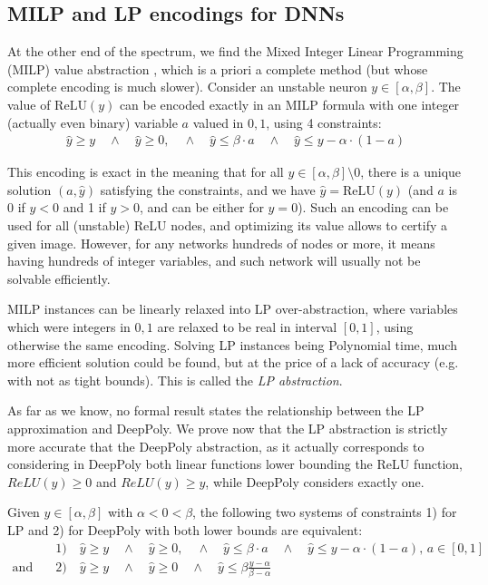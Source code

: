 \documentclass{llncs}
\newcommand{\ReLU}{\mathrm{ReLU}}
\begin{document}
\subsection{MILP and LP encodings for DNNs}

At the other end of the spectrum, we find the Mixed Integer Linear Programming (MILP) value abstraction \cite{MILP}, which is a priori a complete method (but whose complete encoding is much slower). 
Consider an unstable neuron $y \in[\alpha,\beta]$. The value of $\ReLU(y)$ can be encoded exactly in an MILP formula with one integer (actually even binary) variable $a$ valued in ${0,1}$, using 4 constraints:
\vspace{-0.1cm}
\begin{align*}
	\hat{y} \geq y \quad \wedge \quad \hat{y} \geq 0, \quad \wedge \quad \hat{y} \leq \beta \cdot a \quad \wedge \quad \hat{y} \leq y-\alpha \cdot (1-a)
\end{align*}

This encoding is exact in the meaning that \cite{MILP} for all $y \in [\alpha,\beta] \setminus 0$, there is a unique solution $(a,\hat{y})$ satisfying the constraints, and we have $\hat{y}=\ReLU(y)$ (and $a$ is 0 if $y < 0$ and 1 if $y>0$, and can be either for $y=0$). Such an encoding can be used for all (unstable) ReLU nodes, and optimizing its value allows to certify a given image. However, for any networks hundreds of nodes or more, it means having hundreds of integer variables, and such network will usually not be solvable efficiently.

MILP instances can be linearly relaxed into LP over-abstraction, where variables which were integers in 
${0,1}$ are relaxed to be real in interval $[0,1]$, using otherwise the same encoding. 
Solving LP instances being Polynomial time, much more efficient solution could be found, but at the price of a lack of accuracy (e.g. with not as tight bounds). This is called the {\em LP abstraction}.

As far as we know, no formal result states the relationship between the LP approximation and DeepPoly.
We prove now that the LP abstraction is strictly more accurate that the DeepPoly abstraction, as it actually corresponds to considering in DeepPoly both linear functions lower bounding the ReLU function, $ReLU(y) \geq 0$ and $ReLU(y) \geq y$, while DeepPoly considers exactly one.

\begin{proposition}
	\label{LP}
 Given $y \in [\alpha,\beta]$ with $\alpha < 0 < \beta$, the following two systems of constraints 
 1) for LP and 2) for DeepPoly with both lower bounds are equivalent:
 \vspace{-0.3cm}
 \begin{align*}
	 & 1) \quad \hat{y} \geq y \quad \wedge \quad \hat{y} \geq 0, \quad \wedge \quad \hat{y} \leq \beta \cdot a \quad \wedge \quad \hat{y} \leq y-\alpha \cdot (1-a), \, a \in [0,1] \\
	 \text{and} \quad  & 2)  \quad \hat{y} \geq y \quad \wedge \quad \hat{y} \geq 0 \quad \wedge \quad \hat{y} \leq \beta \frac{y-\alpha}{\beta-\alpha}
\end{align*} 
\end{proposition}
\end{document}
